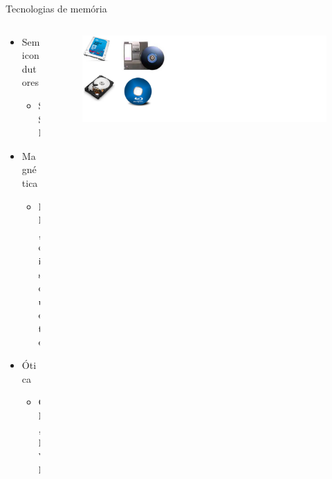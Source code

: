 \documentclass[aspectratio=169,
				xcolor=table]{beamer}
\begin{document}
		\begin{frame}{Tecnologias de memória}
			\begin{columns}
				\begin{column}{0.5\textwidth}
					\begin{itemize}
						\item Semicondutores 
						\begin{itemize}
							\item SSD
						\end{itemize}
						\vspace{1em}
						\item Magnética
						\begin{itemize}
							\item HD, disquete
						\end{itemize}
						\vspace{1em}
						\item Ótica
						\begin{itemize}
							\item CD, DVD
						\end{itemize}
					\end{itemize}
				\end{column}
				\begin{column}{0.5\textwidth}
					\begin{figure}[hbtp]
					\centering
					\includegraphics[height=0.85\textheight, keepaspectratio]{../figs/cap08/massa.png}
					\end{figure}
					
				\end{column}
			\end{columns}
		\end{frame}		
	
\end{document}
